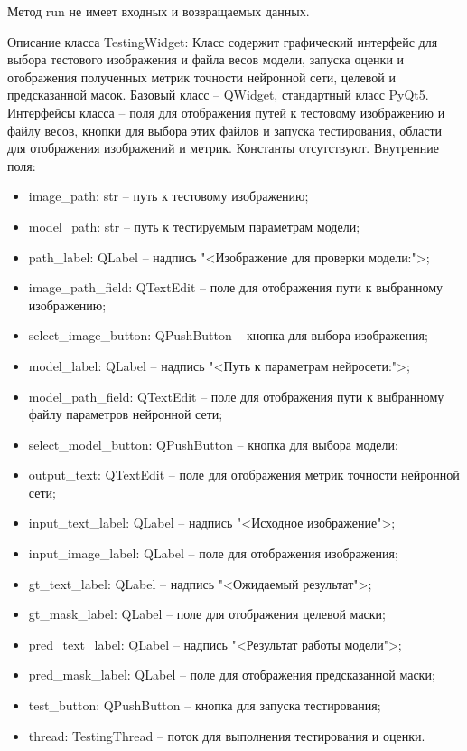 Метод run не имеет входных и возвращаемых данных.

Описание класса TestingWidget:
Класс содержит графический интерфейс для выбора тестового изображения и файла весов модели, запуска оценки и отображения полученных метрик точности нейронной сети, целевой и предсказанной масок. Базовый класс -- QWidget, стандартный класс PyQt5. Интерфейсы класса -- поля для отображения путей к тестовому изображению и файлу весов, кнопки для выбора этих файлов и запуска тестирования, области для отображения изображений и метрик. Константы отсутствуют. Внутренние поля:
\begin{itemize}
	\item image\_path: str -- путь к тестовому изображению;
	\item model\_path: str -- путь к тестируемым параметрам модели;
	\item path\_label: QLabel -- надпись "<Изображение для проверки модели:">;
	\item image\_path\_field: QTextEdit -- поле для отображения пути к выбранному изображению;
	\item select\_image\_button: QPushButton -- кнопка для выбора изображения;
	\item model\_label: QLabel -- надпись "<Путь к параметрам нейросети:">;
	\item model\_path\_field: QTextEdit -- поле для отображения пути к выбранному файлу параметров нейронной сети;
	\item select\_model\_button: QPushButton -- кнопка для выбора модели;
	\item output\_text: QTextEdit -- поле для отображения метрик точности нейронной сети;
	\item input\_text\_label: QLabel -- надпись "<Исходное изображение">;
	\item input\_image\_label: QLabel -- поле для отображения изображения;
	\item gt\_text\_label: QLabel -- надпись "<Ожидаемый результат">;
	\item gt\_mask\_label: QLabel -- поле для отображения целевой маски;
	\item pred\_text\_label: QLabel -- надпись "<Результат работы модели">;
	\item pred\_mask\_label: QLabel -- поле для отображения предсказанной маски;
	\item test\_button: QPushButton -- кнопка для запуска тестирования;
	\item thread: TestingThread -- поток для выполнения тестирования и оценки.
\end{itemize}
